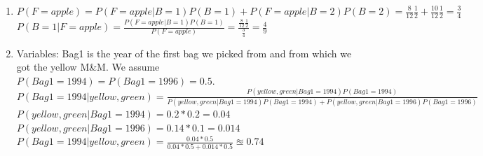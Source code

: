 \begin{solution}
\begin{enumerate}
\item $P(F=apple) = P(F=apple|B=1) P(B=1) + P(F=apple|B=2)P(B=2) = \frac{8}{12} \frac{1}{2} + \frac{10}{12} \frac{1}{2} = \frac{3}{4} $ \\
$P(B=1|F=apple) =  \frac{P(F=apple|B=1)P(B=1)}{P(F=apple)} =  \frac{\frac{8}{12} \frac{1}{2}}{\frac{3}{4}} = \frac{4}{9} $

\item
Variables: Bag1 is the year of the first bag we picked from and from which we got the yellow M\&M. We assume $P(Bag1=1994) = P(Bag1=1996)=0.5$.\\
$P(Bag1=1994 | yellow, green ) = \frac{P(yellow, green | Bag1=1994) P(Bag1=1994) }{P(yellow, green | Bag1=1994) P(Bag1=1994) + P(yellow, green | Bag1=1996) P(Bag1=1996) } $\\
$P(yellow, green | Bag1=1994) = 0.2 * 0.2 = 0.04$\\
$P(yellow, green | Bag1=1996) = 0.14 * 0.1 = 0.014$\\
$P(Bag1=1994 | yellow, green ) =  \frac{0.04 * 0.5}{0.04 * 0.5 + 0.014 * 0.5} \approxeq 0.74$
\end{enumerate}
\end{solution}





%


